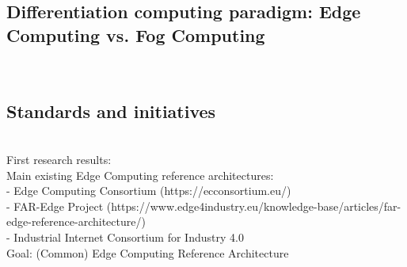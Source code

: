 \subsection{Differentiation computing paradigm: Edge Computing vs. Fog Computing}
\\

\subsection{Standards and initiatives}
\\
First research results:\\
Main existing Edge Computing reference architectures:\\
- Edge Computing Consortium (https://ecconsortium.eu/)\\ 
- FAR-Edge Project (https://www.edge4industry.eu/knowledge-base/articles/far-edge-reference-architecture/)\\
- Industrial Internet Consortium for Industry 4.0\\

Goal: (Common) Edge Computing Reference Architecture